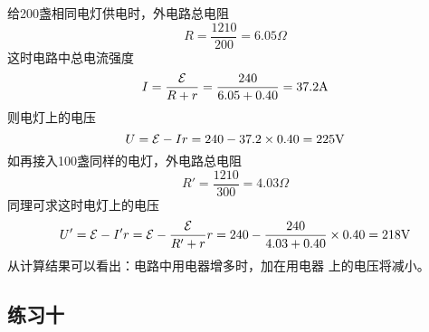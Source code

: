 \begin{enumerate}
\begin{solution}
给200盏相同电灯供电时，外电路总电阻
\[R=\frac{1210}{200}=6.05\Omega\]
这时电路中总电流强度
\[I=\dfrac{\mathcal{E}}{R+r}=\frac{240}{6.05+0.40}=37.2{\rm A}\]
则电灯上的电压
\[U=\mathcal{E}-Ir=240-37.2\times0.40=225{\rm V}\]
如再接入100盏同样的电灯，外电路总电阻
\[R'=\frac{1210}{300}=4.03\Omega\]
同理可求这时电灯上的电压
\[U'=\mathcal{E}-I'r=\mathcal{E}-\frac{\mathcal{E}}{R'+r}r=240-
\frac{240}{4.03+0.40}\times 0.40=218{\rm V}\]
从计算结果可以看出：电路中用电器增多时，加在用电器
上的电压将减小。
\end{solution}

\end{enumerate}




\subsection{练习十}
